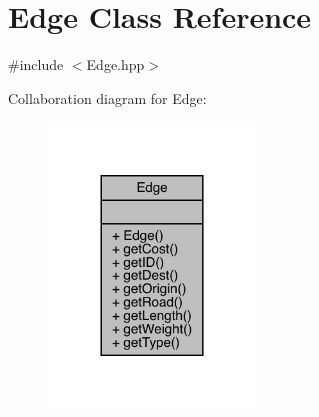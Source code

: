 \hypertarget{class_edge}{}\section{Edge Class Reference}
\label{class_edge}


{\ttfamily \#include $<$Edge.\+hpp$>$}



Collaboration diagram for Edge\+:\nopagebreak
\begin{figure}[H]
\begin{center}
\leavevmode
\includegraphics[width=156pt]{class_edge__coll__graph}
\end{center}
\end{figure}
